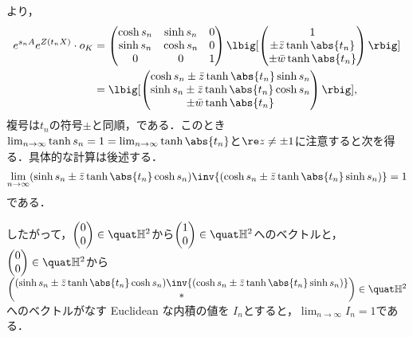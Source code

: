 \begin{pfwn}{}
  より， 
  \begin{align*}
    e^{s_n A}e^{Z(t_n X)}\cdot o_K &=
    \begin{pmatrix}
      \cosh s_n & \sinh s_n & 0 \\
      \sinh s_n & \cosh s_n & 0 \\
      0 & 0 & 1 
    \end{pmatrix}
              \lbig[\begin{pmatrix}
                1\\ \pm \bar{z} \tanh \abs{t_n}  \\ \pm \bar{w} \tanh \abs{t_n}
              \end{pmatrix}\rbig]\\
    &=  \lbig[ \begin{pmatrix}
      \cosh s_n \pm \bar{z} \tanh \abs{t_n} \sinh s_n \\ \sinh s_n \pm \bar{z} \tanh \abs{t_n} \cosh s_n \\ \pm \bar{w} \tanh \abs{t_n}
    \end{pmatrix}\rbig],
  \end{align*}
  複号は$t_n$の符号$\pm$と同順，である．このとき$\lim_{n\to \infty}\tanh s_n = 1 = \lim_{n\to \infty}\tanh \abs{t_n} $と$\re z \neq \pm 1$に注意すると次を得る．具体的な計算は後述する．
  \begin{align}
    \lim_{n\to \infty}(\sinh s_n \pm \bar{z} \tanh \abs{t_n} \cosh s_n)\inv{(\cosh s_n \pm \bar{z} \tanh \abs{t_n} \sinh s_n) } = 1\label{eq:-1}
  \end{align}
  である．

  したがって，$
  \begin{pmatrix}
    0 \\ 0 
  \end{pmatrix}
  \in \quat\mathbb{H}^2 $から$
  \begin{pmatrix}
    1 \\ 0 
  \end{pmatrix}
  \in \quat\mathbb{H}^2 $へのベクトルと，$
  \begin{pmatrix}
    0 \\ 0 
  \end{pmatrix}
  \in \quat\mathbb{H}^2 $から\\
  $ \begin{pmatrix}
    (\sinh s_n \pm \bar{z} \tanh \abs{t_n} \cosh s_n)\inv{(\cosh s_n \pm \bar{z} \tanh \abs{t_n} \sinh s_n) } \\  \ast 
  \end{pmatrix}\in \quat\mathbb{H}^2 $へのベクトルがなす Euclidean な内積の値を $I_n$とすると，$\lim_{n\to \infty}I_n = 1 $である．


\end{pfwn}
